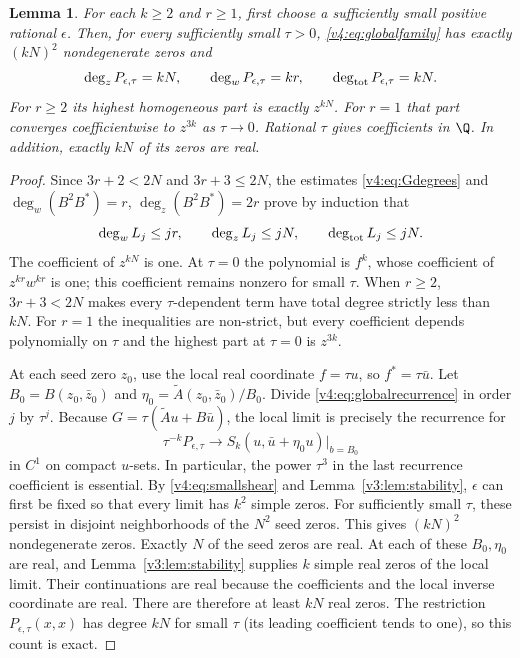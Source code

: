 \documentclass[UTF8,11pt]{ctexart}
\newtheorem{lem}[thm]{Lemma}
\theoremstyle{definition}
\numberwithin{equation}{section}
\begin{document}
\begin{lem}\label{v4:lem:global}
For each $k\ge2$ and $r\ge1$, first choose a sufficiently small
positive rational $\epsilon$. Then, for every sufficiently small
$\tau>0$, \eqref{v4:eq:globalfamily} has exactly $(kN)^2$
nondegenerate zeros and
\[
 \deg_zP_{\epsilon,\tau}=kN,\qquad
 \deg_wP_{\epsilon,\tau}=kr,\qquad
 \deg_{\rm tot}P_{\epsilon,\tau}=kN.
\]
For $r\ge2$ its highest homogeneous part is exactly $z^{kN}$.
For $r=1$ that part converges coefficientwise to $z^{3k}$ as
$\tau\to0$. Rational $\tau$ gives coefficients in $\Q$.
In addition, exactly $kN$ of its zeros are real.
\end{lem}
\begin{proof}
Since $3r+2<2N$ and $3r+3\le2N$, the estimates
\eqref{v4:eq:Gdegrees} and
$\deg_w(B^2B^*)=r$, $\deg_z(B^2B^*)=2r$ prove by induction that
\[
 \deg_wL_j\le jr,\qquad \deg_zL_j\le jN,\qquad
 \deg_{\rm tot}L_j\le jN.
\]
The coefficient of $z^{kN}$ is one. At $\tau=0$ the polynomial is
$f^k$, whose coefficient of $z^{kr}w^{kr}$ is one; this coefficient
remains nonzero for small $\tau$. When $r\ge2$,
$3r+3<2N$ makes every $\tau$-dependent term have total degree
strictly less than $kN$. For $r=1$ the inequalities are non-strict,
but every coefficient depends polynomially on $\tau$ and the
highest part at $\tau=0$ is $z^{3k}$.

At each seed zero $z_0$, use the local real coordinate $f=\tau u$,
so $f^*=\tau\bar u$. Let $B_0=B(z_0,\bar z_0)$ and
$\eta_0=\widetilde A(z_0,\bar z_0)/B_0$.
Divide \eqref{v4:eq:globalrecurrence} in order $j$ by $\tau^j$.
Because $G=\tau(\widetilde A u+B\bar u)$, the local limit is
precisely the recurrence for
\begin{equation}\label{v4:eq:locallimit}
 \tau^{-k}P_{\epsilon,\tau}\longrightarrow
 S_k(u,\bar u+\eta_0u)\big|_{b=B_0}
\end{equation}
in $C^1$ on compact $u$-sets. In particular, the power $\tau^3$
in the last recurrence coefficient is essential.
By \eqref{v4:eq:smallshear} and Lemma~\ref{v3:lem:stability},
$\epsilon$ can first be fixed so that every limit has $k^2$
simple zeros. For sufficiently small $\tau$, these persist in
disjoint neighborhoods of the $N^2$ seed zeros. This gives $(kN)^2$
nondegenerate zeros. Exactly $N$ of the seed zeros are real.
At each of these $B_0,\eta_0$ are real, and
Lemma~\ref{v3:lem:stability} supplies $k$ simple real zeros of
the local limit. Their continuations are real because the
coefficients and the local inverse coordinate are real.
There are therefore at least $kN$ real zeros. The restriction
$P_{\epsilon,\tau}(x,x)$ has degree $kN$ for small $\tau$
(its leading coefficient tends to one), so this count is exact.


\end{proof}
\end{document}
